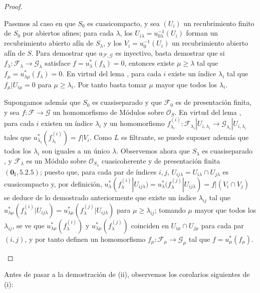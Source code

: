 \begin{proof}
\begin{enumerate}[label=(\roman*)]
\medskip
Pasemos al caso en que $S_0$ es cuasicompacto, y sea $(U_i)$ un recubrimiento finito de $S_0$ por abiertos afines; para cada $\lambda$, los $U_{i\lambda}=u_{0\lambda}^{-1}(U_i)$ forman un recubrimiento abierto afín de $S_\lambda$, y los $V_i=u_0^{-1}(U_i)$ un recubrimiento abierto afín de $S$.
Para demostrar que $u_{\mathcal F,\mathcal G}$ es inyectivo, basta demostrar que si $f_\lambda:\mathcal F_\lambda\to\mathcal G_\lambda$ satisface $f=u_\lambda^*(f_\lambda)=0$, entonces existe $\mu\geq\lambda$ tal que $f_\mu=u_{\lambda\mu}^*(f_\lambda)=0$.
En virtud del lema , para cada $i$ existe un índice $\lambda_i$ tal que $f_\mu|U_{i\mu}=0$ para $\mu\geq\lambda_i$.
Por tanto basta tomar $\mu$ mayor que todos los $\lambda_i$.

Supongamos además que $S_0$ es cuasiseparado y que $\mathcal F_0$ es de presentación finita, y sea $f:\mathcal F\to\mathcal G$ un homomorfismo de Módulos sobre $\mathcal O_S$.
En virtud del lema , para cada $i$ existen un índice $\lambda_i$ y un homomorfismo $f_{\lambda_i}^{(i)}:\mathcal F_{\lambda_i}|U_{i,\lambda_i}
  \to\mathcal G_{\lambda_i}|U_{i,\lambda_i}$ tales que $u_{\lambda_i}^*(f_{\lambda_i}^{(i)})=f|V_i$.
Como $L$ es filtrante, se puede suponer además que todos los $\lambda_i$ son iguales a un único $\lambda$.
Observemos ahora que $S_\lambda$ es cuasiseparado , y $\mathcal F_\lambda$ es un Módulo sobre $\mathcal O_{S_\lambda}$ cuasicoherente y de presentación finita $(\mathbf{0}_{\mathrm I},5.2.5)$; puesto que, para cada par de índices $i,j$, $U_{ij\lambda}=U_{i\lambda}\cap U_{j\lambda}$ es cuasicompacto y, por definición,
$u_\lambda^*(f_\lambda^{(i)}|U_{ij\lambda})
    =u_\lambda^*(f_\lambda^{(j)}|U_{ij\lambda})
    =f|(V_i\cap V_j)$
se deduce de lo demostrado anteriormente que existe un índice $\lambda_{ij}$ tal que
$u_{\lambda\mu}^*(f_\lambda^{(i)}|U_{ij\lambda})
    =u_{\lambda\mu}^*(f_\lambda^{(j)}|U_{ij\lambda})$ para $\mu\geq\lambda_{ij}$; tomando $\mu$ mayor que todos los $\lambda_{ij}$, se ve que $u_{\lambda\mu}^*(f_\lambda^{(i)})$ y $u_{\lambda\mu}^*(f_\lambda^{(j)})$ coinciden en $U_{i\mu}\cap U_{j\mu}$ para cada par $(i,j)$, y por tanto definen un homomorfismo $f_\mu:\mathcal F_\mu\to\mathcal G_\mu$ tal que $f=u_\mu^*(f_\mu)$.

\end{enumerate}
\end{proof}

Antes de pasar a la demostración de (ii), observemos los corolarios siguientes de (i):

